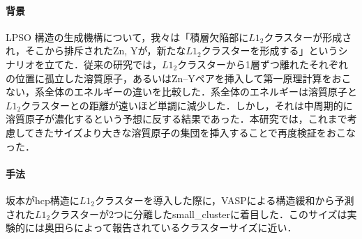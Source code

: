 \documentclass[12pt, a4paper]{jarticle}
\newcommand{\講演番号}
{14pPSA-18}
\newcommand{\講演題目}
{Mg-LPSOのL\mbox{\boldmath $1_2$} クラスターの第一原理計算}
\newcommand{\英文題目}
{First principle calculations of L12 Cluster in Mg-Zn-Y alloy}
\newcommand{\和文所属}
{関西学院大・理工}
\newcommand{\和文氏名}
{西谷滋人, 清原資之, 森下慎也}
\newcommand{\英文所属}
{Department of Informatics, Kwansei Gakuin Univ}
\newcommand{\英文氏名}
{S. R. Nishitani, M. Kiyohara, S. Morishita}
\newlength\題目幅
\newlength\ヘッダ項目間隔
\newlength\所属インデント
\newlength\和文氏名インデント
\newlength\英文氏名インデント
\newlength\最小所属氏名間隔
\newlength\ヘッダ行間隔
\newlength\本文行間隔
\newlength\上端余白
\newlength\左端余白
\begin{document}
\setlength\parindent{1zw}\setlength\baselineskip{\本文行間隔}
\vspace*{\本文行間隔}
\vspace{-1.1\baselineskip}

\paragraph{背景}
LPSO 構造の生成機構について，我々は「積層欠陥部に$L1_2$クラスターが形成され，そこから排斥されたZn, Yが，新たな$L1_2$クラスターを形成する」というシナリオを立てた\cite{sakamoto1}．従来の研究では，$L1_2$クラスターから1層ずつ離れたそれぞれの位置に孤立した溶質原子，あるいはZn--Yペアを挿入して第一原理計算をおこない，系全体のエネルギーの違いを比較した．系全体のエネルギーは溶質原子と$L1_2$クラスターとの距離が遠いほど単調に減少した．しかし，それは中周期的に溶質原子が濃化するという予想に反する結果であった．本研究では，これまで考慮してきたサイズより大きな溶質原子の集団を挿入することで再度検証をおこなった．
\vspace{-0.8\baselineskip}
\paragraph{手法}
坂本がhcp構造に$L1_2$クラスターを導入した際に，VASPによる構造緩和から予測された$L1_2$クラスターが2つに分離したsmall\_clusterに着目した\cite{sakamoto2}．このサイズは実験的には奥田らによって報告されているクラスターサイズに近い\cite{okuda}．
\vspace{-0.3\baselineskip}
\end{document}
